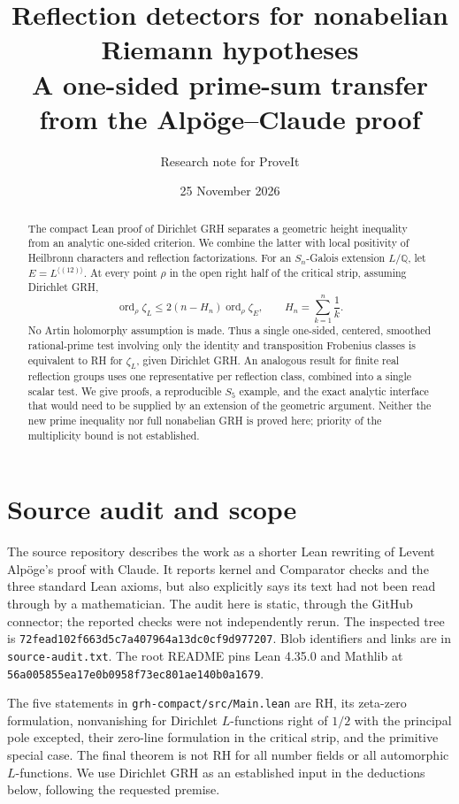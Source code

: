 \documentclass[11pt]{article}
\title{Reflection detectors for nonabelian Riemann hypotheses\\\large A one-sided prime-sum transfer from the Alp\"oge--Claude proof}
\author{Research note for ProveIt}
\date{25 November 2026}
\theoremstyle{remark}\newtheorem{remark}[theorem]{Remark}
\newcommand{\ord}{\operatorname{ord}}
\newcommand{\Q}{\mathbb Q}
\begin{document}
\maketitle
\begin{abstract}
The compact Lean proof of Dirichlet GRH separates a geometric height inequality from an analytic one-sided criterion. We combine the latter with local positivity of Heilbronn characters and reflection factorizations. For an $S_n$-Galois extension $L/\Q$, let $E=L^{\langle(12)\rangle}$. At every point $\rho$ in the open right half of the critical strip, assuming Dirichlet GRH,
\[
\ord_\rho\zeta_L\le 2(n-H_n)\ord_\rho\zeta_E,
\qquad H_n=\sum_{k=1}^n\frac1k.
\]
No Artin holomorphy assumption is made. Thus a single one-sided, centered, smoothed rational-prime test involving only the identity and transposition Frobenius classes is equivalent to RH for $\zeta_L$, given Dirichlet GRH. An analogous result for finite real reflection groups uses one representative per reflection class, combined into a single scalar test. We give proofs, a reproducible $S_5$ example, and the exact analytic interface that would need to be supplied by an extension of the geometric argument. Neither the new prime inequality nor full nonabelian GRH is proved here; priority of the multiplicity bound is not established.
\end{abstract}
\tableofcontents

\section{Source audit and scope}
The source repository \cite{repo} describes the work as a shorter Lean rewriting of Levent Alp\"oge's proof with Claude. It reports kernel and Comparator checks and the three standard Lean axioms, but also explicitly says its text had not been read through by a mathematician. The audit here is static, through the GitHub connector; the reported checks were not independently rerun. The inspected tree is \texttt{72fead102f663d5c7a407964a13dc0cf9d977207}. Blob identifiers and links are in \texttt{source-audit.txt}. The root README pins Lean 4.35.0 and Mathlib at \texttt{56a005855ea17e0b0958f73ec801ae140b0a1679}.

The five statements in \texttt{grh-compact/src/Main.lean} are RH, its zeta-zero formulation, nonvanishing for Dirichlet $L$-functions right of $1/2$ with the principal pole excepted, their zero-line formulation in the critical strip, and the primitive special case. The final theorem is not RH for all number fields or all automorphic $L$-functions. We use Dirichlet GRH as an established input in the deductions below, following the requested premise.
\end{document}
